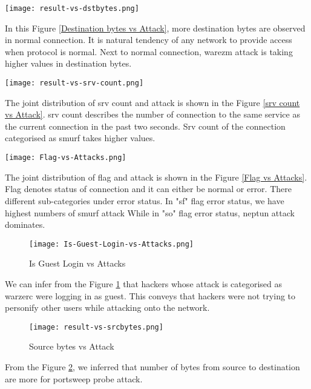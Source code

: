 \documentclass{acm_proc_article-sp}
\begin{document}
\begin{figure*}[h]
\texttt{[image: result-vs-dstbytes.png]}
\centering
\caption{Destination bytes vs Attack}
\label{Destination bytes vs Attack}
\end{figure*}
In this Figure \ref{Destination bytes vs Attack}, more destination bytes are observed in normal connection. It is natural tendency of any network to provide access when protocol is normal. Next to normal connection, warezm attack is taking higher values in destination bytes.

\begin{figure*}[h]
\texttt{[image: result-vs-srv-count.png]}
\centering
\caption{Srv count vs Attack}
\label{srv count vs Attack}
\end{figure*}
The joint distribution of srv count and attack is shown in the Figure \ref{srv count vs Attack}. srv count describes the number of connection to the same service as the current connection in the past two seconds. Srv count of the connection categorised as smurf takes higher values.

\begin{figure*}[p]
\texttt{[image: Flag-vs-Attacks.png]}
\centering
\caption{Flag vs Attacks}
\label{Flag vs Attacks}
\end{figure*}
The joint distribution of flag and attack is shown in the Figure \ref{Flag vs Attacks}. Flag denotes status of connection and it can either be normal or error. There different sub-categories under error status. In "sf" flag error status, we have highest numbers of smurf attack While in "so" flag error status, neptun attack dominates.

\begin{figure}[h]
\texttt{[image: Is-Guest-Login-vs-Attacks.png]}
\centering
\caption{Is Guest Login vs Attacks}
\label{Is Guest Login vs Attacks}
\end{figure}
We can infer from the Figure \ref{Is Guest Login vs Attacks} that hackers whose attack is categorised as warzerc were logging in as guest. This conveys that hackers were not trying to personify other users while attacking onto the network.

\begin{figure}[h]
\texttt{[image: result-vs-srcbytes.png]}
\centering
\caption{Source bytes vs Attack}
\label{Source bytes vs Attack}
\end{figure}
From the Figure \ref{Source bytes vs Attack}, we inferred that number of bytes from source to destination are more for portsweep probe attack.
\end{document}
